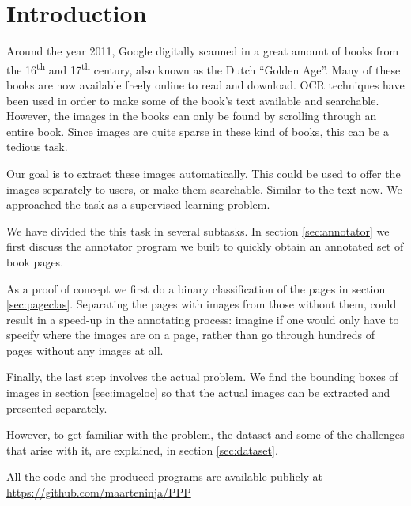 \section{Introduction}
\label{sec:introduction}

%
Around the year 2011, Google digitally scanned in a great amount of books from
the 16\textsuperscript{th} and 17\textsuperscript{th}
century\cite{bloomburg2011}, also known as the Dutch ``Golden Age''. Many of
these books are now available freely online to read and download. OCR techniques
have been used in order to make some of the book's text available and
searchable. However, the images in the books can only be found by scrolling
through an entire book. Since images are quite sparse in these kind of books,
this can be a tedious task.

Our goal is to extract these images automatically. This could be used to offer
the images separately to users, or make them searchable. Similar to the text
now. We approached the task as a supervised learning problem.

We have divided the this task in several subtasks. In section
\ref{sec:annotator} we first discuss the annotator program we built to quickly
obtain an annotated set of book pages.

As a proof of concept we first do a binary classification of the pages in
section \ref{sec:pageclas}.  Separating the pages with images from those without
them, could result in a speed-up in the annotating process: imagine if one
would only have to specify where the images are on a page, rather than go
through hundreds of pages without any images at all.

Finally, the last step involves the actual problem. We find the bounding boxes of
images in section \ref{sec:imageloc} so that the actual images can be extracted
and presented separately.

However, to get familiar with the problem, the dataset and some of the
challenges that arise with it, are explained, in section \ref{sec:dataset}.

All the code and the produced programs are available publicly at
\url{https://github.com/maarteninja/PPP}

